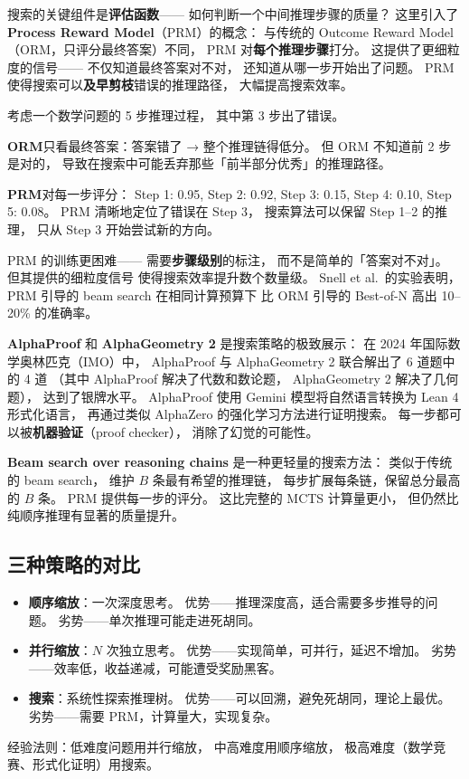 搜索的关键组件是\textbf{评估函数}——
如何判断一个中间推理步骤的质量？
这里引入了 \textbf{Process Reward Model}（PRM）的概念：
与传统的 Outcome Reward Model（ORM，只评分最终答案）不同，
PRM 对\textbf{每个推理步骤}打分。
这提供了更细粒度的信号——
不仅知道最终答案对不对，
还知道从哪一步开始出了问题。
PRM 使得搜索可以\textbf{及早剪枝}错误的推理路径，
大幅提高搜索效率。

\begin{whybox}
考虑一个数学问题的 5 步推理过程，
其中第 3 步出了错误。

\textbf{ORM}只看最终答案：答案错了 → 整个推理链得低分。
但 ORM 不知道前 2 步是对的，
导致在搜索中可能丢弃那些「前半部分优秀」的推理路径。

\textbf{PRM}对每一步评分：
Step 1: 0.95, Step 2: 0.92, Step 3: 0.15, Step 4: 0.10, Step 5: 0.08。
PRM 清晰地定位了错误在 Step 3，
搜索算法可以保留 Step 1--2 的推理，
只从 Step 3 开始尝试新的方向。

PRM 的训练更困难——
需要\textbf{步骤级别}的标注，
而不是简单的「答案对不对」。
但其提供的细粒度信号
使得搜索效率提升数个数量级。
Snell et al.\ 的实验表明，
PRM 引导的 beam search 在相同计算预算下
比 ORM 引导的 Best-of-N 高出 10--20\% 的准确率。
\end{whybox}

\textbf{AlphaProof} 和 \textbf{AlphaGeometry 2}
是搜索策略的极致展示：
在 2024 年国际数学奥林匹克（IMO）中，
AlphaProof 与 AlphaGeometry 2 联合解出了 6 道题中的 4 道
（其中 AlphaProof 解决了代数和数论题，
AlphaGeometry 2 解决了几何题），
达到了银牌水平。
AlphaProof 使用 Gemini 模型将自然语言转换为 Lean 4 形式化语言，
再通过类似 AlphaZero 的强化学习方法进行证明搜索。
每一步都可以被\textbf{机器验证}（proof checker），
消除了幻觉的可能性。

\textbf{Beam search over reasoning chains}
是一种更轻量的搜索方法：
类似于传统的 beam search，
维护 $B$ 条最有希望的推理链，
每步扩展每条链，保留总分最高的 $B$ 条。
PRM 提供每一步的评分。
这比完整的 MCTS 计算量更小，
但仍然比纯顺序推理有显著的质量提升。

\subsection{三种策略的对比}

\begin{keybox}[推理时计算策略对比]
\begin{itemize}[noitemsep]
  \item \textbf{顺序缩放}：一次深度思考。
        优势——推理深度高，适合需要多步推导的问题。
        劣势——单次推理可能走进死胡同。
  \item \textbf{并行缩放}：$N$ 次独立思考。
        优势——实现简单，可并行，延迟不增加。
        劣势——效率低，收益递减，可能遭受奖励黑客。
  \item \textbf{搜索}：系统性探索推理树。
        优势——可以回溯，避免死胡同，理论上最优。
        劣势——需要 PRM，计算量大，实现复杂。
\end{itemize}
经验法则：低难度问题用并行缩放，
中高难度用顺序缩放，
极高难度（数学竞赛、形式化证明）用搜索。
\end{keybox}

